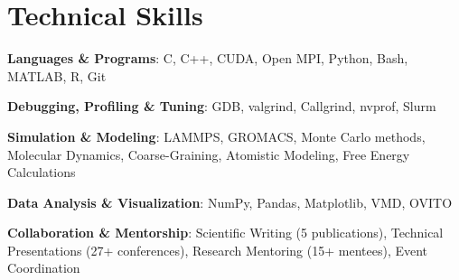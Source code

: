 \section*{Technical Skills}
\begin{tabitemize}
  \item \textbf{Languages \& Programs}: C, C++, CUDA, Open MPI, Python, Bash, MATLAB, R, Git
  \item \textbf{Debugging, Profiling \& Tuning}: GDB, valgrind, Callgrind, nvprof, Slurm
  \item \textbf{Simulation \& Modeling}: LAMMPS, GROMACS, Monte Carlo methods, Molecular Dynamics, Coarse-Graining, Atomistic Modeling, Free Energy Calculations
  \item \textbf{Data Analysis \& Visualization}: NumPy, Pandas, Matplotlib, VMD, OVITO
  \item \textbf{Collaboration \& Mentorship}: Scientific Writing (5 publications), Technical Presentations (27+ conferences), Research Mentoring (15+ mentees), Event Coordination
\end{tabitemize}
\vspace{-1.2\baselineskip}
